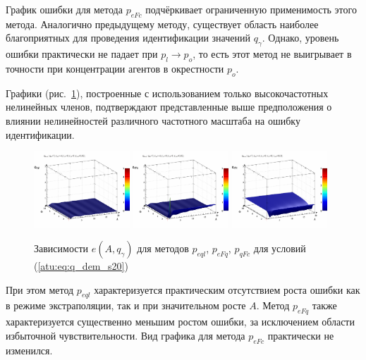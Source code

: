 График ошибки для метода $p_{eFc}$ подчёркивает ограниченную применимость этого метода.
Аналогично предыдущему методу, существует область наиболее благоприятных для
проведения идентификации значений $q_\gamma$. Однако,
уровень ошибки практически не падает при $p_l \to p_o$,
то есть этот метод не выигрывает в точности при концентрации
агентов в окрестности $p_o$.

Графики (рис.~\ref{atu:f:qsl_pe_A_qg_s20}), построенные с использованием
только высокочастотных нелинейных членов,
подтверждают представленные выше предположения
о влиянии нелинейностей различного частотного масштаба
на ошибку идентификации.

\begin{figure}[htb!]
  \centerline{
    \includegraphics[width=0.32\textwidth]{p/qls_pe-p_A_qg_eql_s20.png}
    \hfill
    \includegraphics[width=0.32\textwidth]{p/qls_pe-p_A_qg_eFq_s20.png}
    \hfill
    \includegraphics[width=0.32\textwidth]{p/qls_pe-p_A_qg_eFc_s20.png}
  }
  \caption{Зависимости $e(A,q_\gamma)$ для методов $p_{eql}$, $p_{eFq}$, $p_{qFc}$ для условий (\ref{atu:eq:q_dem_s20})}
  \label{atu:f:qsl_pe_A_qg_s20}
\end{figure}

При этом метод $p_{eql}$ характеризуется практическим отсутствием роста
ошибки как в режиме экстраполяции, так и при значительном росте $A$.
Метод $p_{eFq}$ также характеризуется существенно меньшим ростом
ошибки, за исключением области избыточной чувствительности.
Вид графика для метода $p_{eFc}$ практически не изменился.

